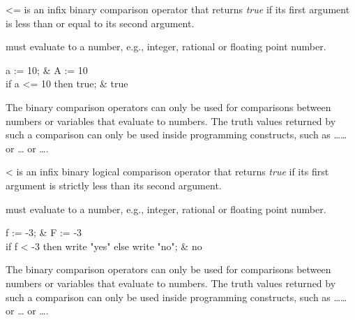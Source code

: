 \begin{Operator}[leqsign]{<=}
\name{<=} is an infix binary comparison operator that returns
{\em true} if its first argument is less than or equal to its second argument.

\begin{Syntax}
 \name{<=} 
\end{Syntax}

 must evaluate to a number, e.g., integer, rational or
floating point number.

\begin{Examples}
a := 10;                     &     A := 10 \\
if a <= 10 then true;        &     true
\end{Examples}

\begin{Comments}

The binary comparison operators can only be used for comparisons between
numbers or variables that evaluate to numbers.  The truth values returned
by such a comparison can only be used inside programming constructs, such
as \ldots{}\ldots{} or
\ldots{} or \ldots{}.
\end{Comments}
\end{Operator}


\begin{Operator}[less]{<}
\name{<} is an infix binary logical comparison operator that
returns {\em true} if its first argument is strictly less than its second
argument.

\begin{Syntax}
 \name{<} 
\end{Syntax}

 must evaluate to a number, e.g., integer, rational or
floating point number.

\begin{Examples}
f := -3;                                               &       F := -3 \\
if f < -3 then write "yes" else write "no";            &       no
\end{Examples}

\begin{Comments}
The binary comparison operators can only be used for comparisons between
numbers or variables that evaluate to numbers.  The truth values returned
by such a comparison can only be used inside programming constructs, such
as \ldots{}\ldots{}
or \ldots{} or
\ldots{}.
\end{Comments}
\end{Operator}

